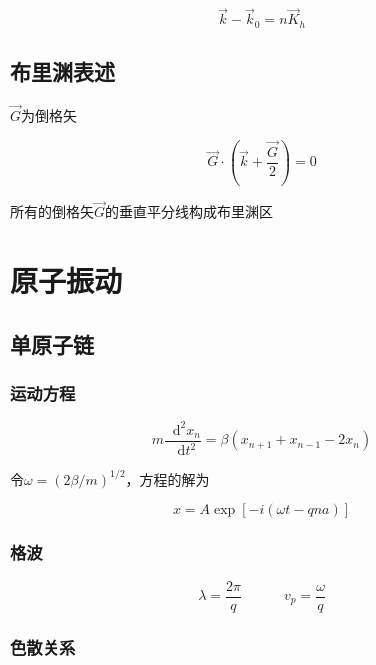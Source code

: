 \documentclass{article}
\newcommand*{\md}{\mathop{}\!\mathrm{d}}
\begin{document}
\begin{multicols}{2}
\begin{equation*}
  \vec{k} - \vec{k}_0 = n \vec{K}_h
\end{equation*}

\subsection{布里渊表述}

$\vec{G}$为倒格矢

\begin{equation*}
  \vec{G} \cdot \left( \vec{k} + \frac{\vec{G}}{2} \right) = 0
\end{equation*}

所有的倒格矢$\vec{G}$的垂直平分线构成布里渊区

\section{原子振动}

\subsection{单原子链}

\subsubsection{运动方程}

\begin{equation*}
  m \frac{\md^2 x_n}{\md t^2} = \beta \left( x_{n+1} + x_{n-1} - 2x_n \right)
\end{equation*}

令$\omega=\left( 2\beta/m \right)^{1/2}$，方程的解为

\begin{equation*}
  x=A\exp \left[ - i \left( \omega t - qna \right) \right]
\end{equation*}

\subsubsection{格波}

\begin{equation*}
  \lambda = \frac{2\pi}{q} \quad\quad\quad v_p = \frac{\omega}{q}
\end{equation*}

\subsubsection{色散关系}


\end{multicols}
\end{document}
